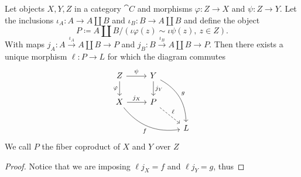\begin{proposition}
Let objects \(X, Y, Z\) in a category \(\cat C\) and morphisms \(\varphi : Z
\to X\) and \(\psi : Z \to Y\). Let the inclusions \(\iota_A : A \to A \amalg
B\) and  \(\iota_B: B \to A \amalg B\) and define the object
\[
    P \coloneq A \amalg B / (\iota  \varphi(z) \sim \iota  \psi(z),\
    z \in Z).
\]
With maps \(j_A : A \xrightarrow{\iota_A} A \amalg B \to P\) and  \(j_B : B
\xrightarrow{\iota_B} A \amalg B \to P\). Then there exists a unique morphism
\(\ell : P \to L\) for which the diagram commutes
  \[
    \begin{tikzcd}
      Z
      \ar[r, "\psi"]
      \ar[d, swap, "\varphi"]
        &Y
        \ar[d, "j_Y"]
        \ar[ddr, bend left, "g"]
          &\\
      X
      \ar[r, "j_X"]
      \ar[drr, bend right, swap, "f"]
        &P
        \ar[dr, dashed, "\ell"]
          &\\
        &
          &L
    \end{tikzcd}
\]
We call \(P\) the fiber coproduct of \(X\) and \(Y\) over \(Z\)
\end{proposition}

\begin{proof}
Notice that we are imposing \(\ell  j_X = f\) and \(\ell  j_Y =
g\), thus
\end{proof}
